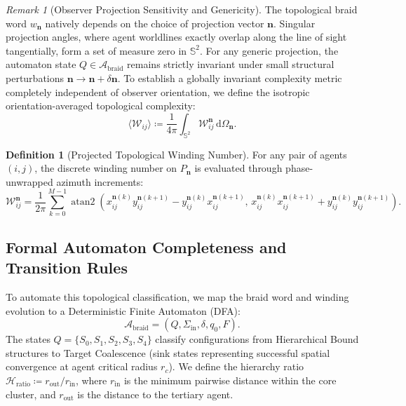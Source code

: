 \documentclass[11pt,a4paper,reqno]{article}
\theoremstyle{plain}
\theoremstyle{definition}
\newtheorem{definition}[theorem]{Definition}
\theoremstyle{remark}
\newtheorem{remark}[theorem]{Remark}
\numberwithin{equation}{section}
\begin{document}
\begin{remark}[Observer Projection Sensitivity and Genericity]
\label{rem:observer_genericity}
The topological braid word $w_{\mathbf{n}}$ natively depends on the choice of projection vector $\mathbf{n}$. Singular projection angles, where agent worldlines exactly overlap along the line of sight tangentially, form a set of measure zero in $\mathbb{S}^2$. For any generic projection, the automaton state $Q \in \mathcal{A}_{\mathrm{braid}}$ remains strictly invariant under small structural perturbations $\mathbf{n} \to \mathbf{n} + \delta\mathbf{n}$. To establish a globally invariant complexity metric completely independent of observer orientation, we define the isotropic orientation-averaged topological complexity:
\begin{equation}
\langle \mathcal{W}_{ij} \rangle \coloneqq \frac{1}{4\pi} \int_{\mathbb{S}^2} \mathcal{W}_{ij}^{\mathbf{n}} \, \mathrm{d}\Omega_{\mathbf{n}}.
\end{equation}
\end{remark}

\begin{definition}[Projected Topological Winding Number]
For any pair of agents $(i, j)$, the discrete winding number on $P_{\mathbf{n}}$ is evaluated through phase-unwrapped azimuth increments:
\begin{equation}
\label{eq:discrete_winding}
\mathcal{W}_{ij}^{\mathbf{n}} = \frac{1}{2\pi} \sum_{k=0}^{M-1} \operatorname{atan2}\left(x_{ij}^{\mathbf{n}(k)} y_{ij}^{\mathbf{n}(k+1)} - y_{ij}^{\mathbf{n}(k)} x_{ij}^{\mathbf{n}(k+1)}, \, x_{ij}^{\mathbf{n}(k)} x_{ij}^{\mathbf{n}(k+1)} + y_{ij}^{\mathbf{n}(k)} y_{ij}^{\mathbf{n}(k+1)}\right).
\end{equation}
\end{definition}

\subsection{Formal Automaton Completeness and Transition Rules}

To automate this topological classification, we map the braid word and winding evolution to a Deterministic Finite Automaton (DFA):
\begin{equation}
\mathcal{A}_{\mathrm{braid}} = \left( Q, \Sigma_{\mathrm{in}}, \delta, q_0, F \right).
\end{equation}
The states $Q = \{S_0, S_1, S_2, S_3, S_4\}$ classify configurations from Hierarchical Bound structures to Target Coalescence (sink states representing successful spatial convergence at agent critical radius $r_c$). We define the hierarchy ratio $\mathcal{H}_{\mathrm{ratio}} \coloneqq r_{\mathrm{out}} / r_{\mathrm{in}}$, where $r_{\mathrm{in}}$ is the minimum pairwise distance within the core cluster, and $r_{\mathrm{out}}$ is the distance to the tertiary agent.
\end{document}
